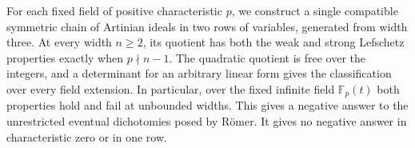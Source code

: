 
For each fixed field of positive characteristic $p$, we construct a single
compatible symmetric chain of Artinian ideals in two rows of variables, generated
from width three. At every width $n\geq2$, its quotient has both the weak and
strong Lefschetz properties exactly when $p\nmid n-1$. The quadratic quotient is
free over the integers, and a determinant for an arbitrary linear form gives the
classification over every field extension. In particular, over the fixed infinite
field $\mathbb F_p(t)$ both properties hold and fail at unbounded widths.
This gives a negative answer to the unrestricted eventual dichotomies posed by
R\"omer. It gives no negative answer in characteristic zero or in one row.
